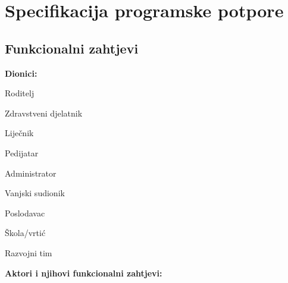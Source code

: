 \chapter{Specifikacija programske potpore}
		
	\section{Funkcionalni zahtjevi}
			\noindent \textbf{Dionici:}
			
			\begin{packed_enum}
				
				\item Roditelj
				\item Zdravstveni djelatnik	
				\begin{packed_enum}
					\item Liječnik
					\item Pedijatar
				\end{packed_enum}			
				\item Administrator
				\item Vanjski sudionik
				\begin{packed_enum}
					\item Poslodavac
					\item Škola/vrtić
				\end{packed_enum}
				\item Razvojni tim
			\end{packed_enum}
			
			\noindent \textbf{Aktori i njihovi funkcionalni zahtjevi:}
			
